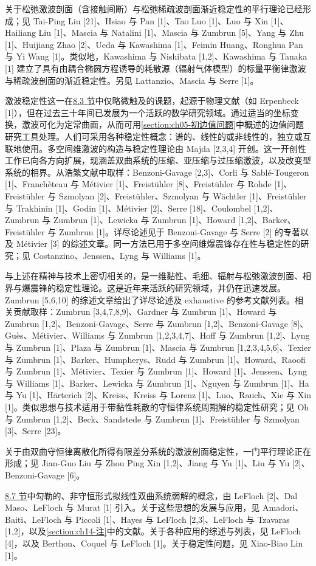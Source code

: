 \documentclass[../../main.tex]{subfiles}
\begin{document}
关于松弛激波剖面（含接触间断）与松弛稀疏波剖面渐近稳定性的平行理论已经形成；见 Tai-Ping Liu [21]、Hsiao 与 Pan [1]、Tao Luo [1]、Luo 与 Xin [1]、Hailiang Liu [1]、Mascia 与 Natalini [1]、Mascia 与 Zumbrun [5]、Yang 与 Zhu [1]、Huijiang Zhao [2]、Ueda 与 Kawashima [1]、Feimin Huang、Ronghua Pan 与 Yi Wang [1]。类似地，Kawashima 与 Nishibata [1,2]、Kawashima 与 Tanaka [1] 建立了具有由耦合椭圆方程诱导的耗散源（辐射气体模型）的标量平衡律激波与稀疏波剖面的渐近稳定性。另见 Lattanzio、Mascia 与 Serre [1]。

激波稳定性这一在\hyperref[section:ch08-lax容许性准则]{8.3 节}中仅略微触及的课题，起源于物理文献（如 Erpenbeck [1]），但在过去三十年间已发展为一个活跃的数学研究领域。通过适当的坐标变换，激波可化为定常曲面，从而可用\cref{section:ch05-初边值问题}中概述的边值问题研究工具处理。人们可采用各种稳定性概念：谱的、线性的或非线性的，独立或互联地使用。多空间维激波的构造与稳定性理论由 Majda [2,3,4] 开创。这一开创性工作已向各方向扩展，现涵盖双曲系统的压缩、亚压缩与过压缩激波，以及改变型系统的相界。从浩繁文献中取样：Benzoni-Gavage [2,3]、Corli 与 Sablé-Tougeron [1]、Franchèteau 与 Métivier [1]、Freistühler [8]、Freistühler 与 Rohde [1]、Freistühler 与 Szmolyan [2]、Freistühler、Szmolyan 与 Wächtler [1]、Freistühler 与 Trakhinin [1]、Godin [1]、Métivier [2]、Serre [18]、Coulombel [1,2]、Zumbrun 与 Zumbrun [1]、Lewicka 与 Zumbrun [1]、Howard [1,2]、Barker、Freistühler 与 Zumbrun [1]。详尽论述见于 Benzoni-Gavage 与 Serre [2] 的专著以及 Métivier [3] 的综述文章。同一方法已用于多空间维爆震锋存在性与稳定性的研究；见 Costanzino、Jenssen、Lyng 与 Williams [1]。

与上述在精神与技术上密切相关的，是一维黏性、毛细、辐射与松弛激波剖面、相界与爆震锋的稳定性理论。这是近年来活跃的研究领域，并仍在迅速发展。Zumbrun [5,6,10] 的综述文章给出了详尽论述及 exhaustive 的参考文献列表。相关贡献取样：Zumbrun [3,4,7,8,9]、Gardner 与 Zumbrun [1]、Howard 与 Zumbrun [1,2]、Benzoni-Gavage、Serre 与 Zumbrun [1,2]、Benzoni-Gavage [8]、Guès、Métivier、Williams 与 Zumbrun [1,2,3,4,7]、Hoff 与 Zumbrun [1,2]、Lyng 与 Zumbrun [1]、Plaza 与 Zumbrun [1]、Mascia 与 Zumbrun [1,2,3,4,5,6]、Texier 与 Zumbrun [1]、Barker、Humpherys、Rudd 与 Zumbrun [1]、Howard、Raoofi 与 Zumbrun [1]、Métivier、Texier 与 Zumbrun [1]、Howard [1]、Jenssen、Lyng 与 Williams [1]、Barker、Lewicka 与 Zumbrun [1]、Nguyen 与 Zumbrun [1]、Ha 与 Yu [1]、Härterich [2]、Kreiss、Kreiss 与 Lorenz [1]、Luo、Rauch、Xie 与 Xin [1]。类似思想与技术适用于带黏性耗散的守恒律系统周期解的稳定性研究；见 Oh 与 Zumbrun [1,2]、Beck、Sandstede 与 Zumbrun [1]、Freistühler 与 Szmolyan [3]、Serre [23]。

关于由双曲守恒律离散化所得有限差分系统的激波剖面稳定性，一门平行理论正在形成；见 Jian-Guo Liu 与 Zhou Ping Xin [1,2]、Jiang 与 Yu [1]、Liu 与 Yu [2]、Benzoni-Gavage [6]。

\hyperref[section:ch08-非守恒激波]{8.7 节}中勾勒的、非守恒形式拟线性双曲系统弱解的概念，由 LeFloch [2]、Dal Maso、LeFloch 与 Murat [1] 引入。关于这些思想的发展与应用，见 Amadori、Baiti、LeFloch 与 Piccoli [1]、Hayes 与 LeFloch [2,3]、LeFloch 与 Tzavaras [1,2]，以及\cref{section:ch14-注}中的文献。关于各种应用的综述与列表，见 LeFloch [4]，以及 Berthon、Coquel 与 LeFloch [1]。关于稳定性问题，见 Xiao-Biao Lin [1]。
\end{document}
